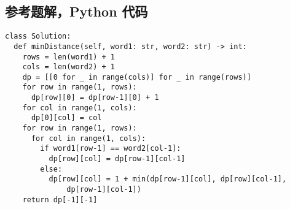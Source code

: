 \subsection{参考题解，Python 代码}

\begin{verbatim}
class Solution:
  def minDistance(self, word1: str, word2: str) -> int:
    rows = len(word1) + 1
    cols = len(word2) + 1
    dp = [[0 for _ in range(cols)] for _ in range(rows)]
    for row in range(1, rows):
      dp[row][0] = dp[row-1][0] + 1
    for col in range(1, cols):
      dp[0][col] = col
    for row in range(1, rows):
      for col in range(1, cols):
        if word1[row-1] == word2[col-1]:
          dp[row][col] = dp[row-1][col-1]
        else:
          dp[row][col] = 1 + min(dp[row-1][col], dp[row][col-1],
              dp[row-1][col-1])
    return dp[-1][-1]
\end{verbatim}
